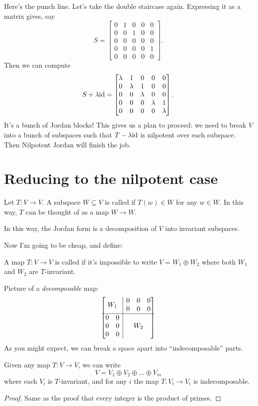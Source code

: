 Here's the punch line.
Let's take the double staircase again.
Expressing it as a matrix gives, say
\[
	S = \begin{bmatrix}
		0 & 1 & 0 & 0 & 0 \\
		0 & 0 & 1 & 0 & 0 \\
		0 & 0 & 0 & 0 & 0 \\
		0 & 0 & 0 & 0 & 1 \\
		0 & 0 & 0 & 0 & 0
	\end{bmatrix}.
\]
Then we can compute
\[
	S + \lambda \mathrm{id} = \begin{bmatrix}
		\lambda & 1 & 0 & 0 & 0 \\
		0 & \lambda & 1 & 0 & 0 \\
		0 & 0 & \lambda & 0 & 0 \\
		0 & 0 & 0 & \lambda & 1 \\
		0 & 0 & 0 & 0 & \lambda
	\end{bmatrix}.
\]
It's a bunch of Jordan blocks!
This gives us a plan to proceed: we need to break $V$ into
a bunch of subspaces such that $T - \lambda \mathrm{id}$ is nilpotent over each subspace.
Then Nilpotent Jordan will finish the job.

\section{Reducing to the nilpotent case}
\begin{definition}
	Let $T : V \to V$. A subspace $W \subseteq V$
	is called 
	if $T(w) \in W$ for any $w \in W$.
	In this way, $T$ can be thought of as a map $W \to W$.
\end{definition}
In this way, the Jordan form is a decomposition of $V$ into invariant subspaces.

Now I'm going to be cheap, and define:
\begin{definition}
	A map $T : V \to V$ is called 
	if it's impossible to write $V = W_1 \oplus W_2$
	where both $W_1$ and $W_2$ are $T$-invariant.
\end{definition}
Picture of a \emph{decomposable} map:
\[ 
	\begin{bmatrix}
		\multicolumn{2}{c|}{\multirow{2}{*}{$W_1$}} & 0 & 0 & 0  \\ 
		\multicolumn{2}{c|}{} & 0 & 0 & 0 \\ \hline
		0 & 0 & \multicolumn{3}{|c}{\multirow{3}{*}{$W_2$}} \\
		0 & 0 & \multicolumn{3}{|c}{} \\
		0 & 0 & \multicolumn{3}{|c}{} 
	\end{bmatrix}
\]
As you might expect, we can break a space apart into ``indecomposable'' parts.
\begin{proposition}
	Given any map $T: V \to V$, we can write
	\[ V = V_1 \oplus V_2 \oplus \dots \oplus V_m \]
	where each $V_i$ is $T$-invariant,
	and for any $i$ the map $T : V_i \to V_i$ is indecomposable.
\end{proposition}
\begin{proof}
	Same as the proof that every integer is the product of primes.
\end{proof}

